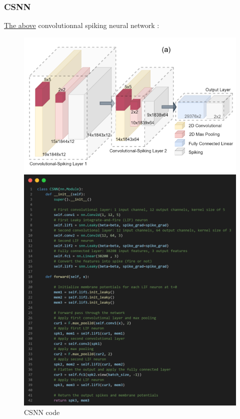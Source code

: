 \documentclass[11pt]{article}
\begin{document}
\subsubsection*{CSNN}

\hyperref[fig:csnn_template]{The above} convolutionnal spiking neural network :

\begin{figure}[H]
  \begin{minipage}{0.4\textwidth}
    \centering
    \includegraphics[width=0.9\linewidth]{image/csnn_template_model.png}
  \end{minipage}
  \begin{minipage}{0.6\textwidth}
    \centering
    \includegraphics[width=\textwidth]{./image/csnn_code.png}    \caption{CSNN code}
    \label{fig:csnn_code}

  \end{minipage}
\end{figure}
\end{document}
